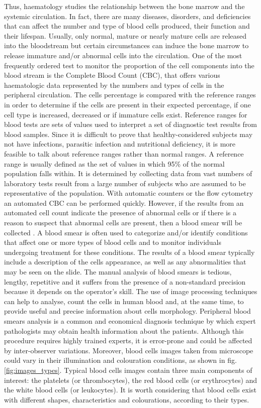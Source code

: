 \documentclass[sensors,review,submit,moreauthors,pdftex,10pt,a4paper]{mdpi}
\begin{document}
Thus, haematology studies the relationship between the bone marrow and the systemic circulation. In fact, there are many diseases, disorders, and deficiencies that can affect the number and type of blood cells produced, their function and their lifespan. Usually, only normal, mature or nearly mature cells are released into the bloodstream but certain circumstances can induce the bone marrow to release immature and/or abnormal cells into the circulation. One of the most frequently ordered test to monitor the proportion of the cell components into the blood stream is the Complete Blood Count (CBC), that offers various haematologic data represented by the numbers and types of cells in the peripheral circulation. The cells percentage is compared with the reference ranges in order to determine if the cells are present in their expected percentage, if one cell type is increased, decreased or if immature cells exist. Reference ranges for blood tests are sets of values used to interpret a set of diagnostic test results from blood samples. Since it is difficult to prove that healthy-considered subjects may not have infections, parasitic infection and nutritional deficiency, it is more feasible to talk about reference ranges rather than normal ranges. A reference range is usually defined as the set of values in which 95\% of the normal population falls within. It is determined by collecting data from vast numbers of laboratory tests result from a large number of subjects who are assumed to be representative of the population. With automatic counters or the flow cytometry an automated CBC can be performed quickly. However, if the results from an automated cell count indicate the presence of abnormal cells or if there is a reason to suspect that abnormal cells are present, then a blood smear will be collected \cite{Loddo2016}. A blood smear is often used to categorize and/or identify conditions that affect one or more types of blood cells and to monitor individuals undergoing treatment for these conditions. The results of a blood smear typically include a description of the cells appearance, as well as any abnormalities that may be seen on the slide. The manual analysis of blood smears is tedious, lengthy, repetitive and it suffers from the presence of a non-standard precision because it depends on the operator's skill. The use of image processing techniques can help to analyse, count the cells in human blood and, at the same time, to provide useful and precise information about cells morphology.
Peripheral blood smears analysis is a common and economical diagnosis technique by which expert pathologists may obtain health information about the patients. Although this procedure requires highly trained experts, it is error-prone and could be affected by inter-observer variations. Moreover, blood cells images taken from microscope could vary in their illumination and colouration conditions, as shown in fig. \ref{fig:images_types}. Typical blood cells images contain three main components of interest: the platelets (or thrombocytes), the red blood cells (or erythrocytes) and the white blood cells (or leukocytes). It is worth considering that blood cells exist with different shapes, characteristics and colourations, according to their types.
\end{document}

